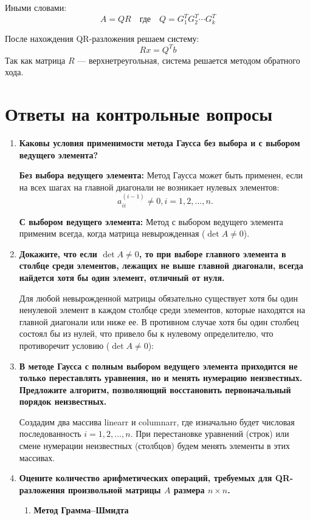 \documentclass[12pt, a4paper]{article}
\begin{document}
	Иными словами:
	$$A=QR \quad \text{где} \quad Q=G_1^{T}G_2^{T} \cdots G_{k}^{T}$$
	
	После нахождения QR-разложения решаем систему:
	$$Rx=Q^{T}b$$
	Так как матрица $R$ — верхнетреугольная, система решается методом обратного хода.
	\section{Ответы на контрольные вопросы}
	\begin{enumerate}
	\item \textbf{Каковы условия применимости метода Гаусса без выбора
	и с выбором ведущего элемента?}
	
		\textbf{Без выбора ведущего элемента:} Метод Гаусса может быть применен, если на всех шагах на главной диагонали не возникает нулевых элементов: $$a^{(i-1)}_{ii}\ne 0, i = 1,2,\ldots,n.$$

		 \textbf {С выбором ведущего элемента:} Метод с выбором ведущего элемента  применим всегда, когда матрица невырожденная ($\det A \ne 0$).
		 
	\item \textbf{Докажите, что если $\det A \ne 0$, то при выборе главного
	элемента в столбце среди элементов, лежащих не выше главной диагонали, всегда найдется хотя бы один элемент, отличный от нуля.}
	
		 Для любой невырожденной матрицы обязательно существует хотя бы один ненулевой элемент в каждом столбце среди элементов, которые находятся на главной диагонали или ниже ее. В противном случае хотя бы один столбец состоял бы из нулей, что привело бы к нулевому определителю, что противоречит условию ($\det A \ne 0$):
	

	\item \textbf{В методе Гаусса с полным выбором ведущего элемента приходится не только переставлять уравнения, но и менять нумерацию неизвестных. Предложите алгоритм, позволяющий восстановить первоначальный порядок неизвестных.}
	
	Создадим два массива linearr и columnarr, где изначально будет числовая последованность $i=1,2,\ldots,n$. При перестановке уравнений (строк) или смене нумерации неизвестных (столбцов) будем менять элементы в этих массивах. 
	
	
	
	\item \textbf{Оцените количество арифметических операций, требуемых
	для QR-разложения произвольной матрицы $A$ размера $n \times n$.}
	\begin{enumerate}
		\item \textbf{ Метод Грамма--Шмидта}
		

\end{enumerate}
\end{enumerate}
\end{document}
